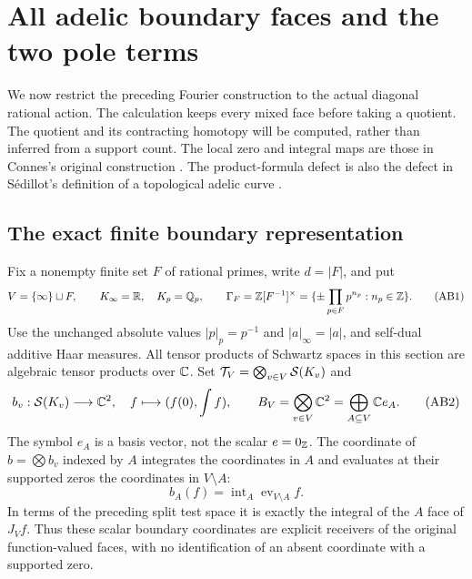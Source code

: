 \section{All adelic boundary faces and the two pole terms}
\label{sec:adelic-boundary}
We now restrict the preceding Fourier construction to the actual diagonal
rational action. The calculation keeps every mixed face before taking a
quotient. The quotient and its contracting homotopy will be computed, rather
than inferred from a support count. The local zero and integral maps are those
in Connes's original construction \cite[Section III, (6)--(11)]{Connes1998}.
The product-formula defect is also the defect in S\'edillot's definition of a
topological adelic curve \cite[\texttt{def:topological\_adelic\_curve}]{Sedillot}.

\subsection{The exact finite boundary representation}
Fix a nonempty finite set $F$ of rational primes, write $d=|F|$, and put
\[
 V=\{\infty\}\sqcup F,\qquad K_\infty=\mathbb R,\quad K_p=\mathbb Q_p,
 \qquad \Gamma_F=\mathbb Z[F^{-1}]^\times
 =\{\pm\prod_{p\in F}p^{n_p}:n_p\in\mathbb Z\}.
 \tag{AB1}
\]
Use the unchanged absolute values $|p|_p=p^{-1}$ and $|a|_\infty=|a|$,
and self-dual additive Haar measures. All tensor products of Schwartz spaces
in this section are algebraic tensor products over $\mathbb C$.
Set $\mathcal T_V=\bigotimes_{v\in V}\mathcal S(K_v)$ and
\[
 b_v:\mathcal S(K_v)\longrightarrow\mathbb C^2,\quad
 f\longmapsto(f(0),\int f),\qquad
 B_V=\bigotimes_{v\in V}\mathbb C^2=\bigoplus_{A\subseteq V}\mathbb C e_A.
 \tag{AB2}
\]
The symbol $e_A$ is a basis vector, not the scalar $e=0_\mathbb Z$.
The coordinate of $b=\bigotimes b_v$ indexed by $A$ integrates the coordinates
in $A$ and evaluates at their supported zeros the coordinates in $V\setminus A$:
\[
 b_A(f)=\operatorname{int}_A\operatorname{ev}_{V\setminus A}f.
 \tag{AB3}
\]
In terms of the preceding split test space it is exactly the integral of the
$A$ face of $J_Vf$. Thus these scalar boundary coordinates are explicit
receivers of the original function-valued faces, with no identification of
an absent coordinate with a supported zero.

